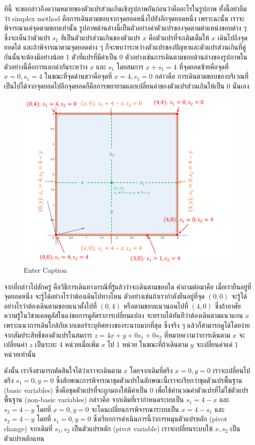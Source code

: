 ทีนี้ จะขอกล่าวถึงความหมายของตัวแปรส่วนเกินเชิงรูปภาพกันก่อนว่าคืออะไรในรูปภาพ ทั้งนี้อย่าลืมว่า simplex method คือการเดินตามขอบจากจุดยอดหนึ่งไปยังอีกจุดยอดหนึ่ง เพราะฉะนั้น เราจะพิจารณาแค่จุดตามขอบเท่านั้น รูปภาพด้านล่างนี้เป็นตัวอย่างค่าตัวแปรของจุดตามตำแหน่งขอบต่าง ๆ ซึ่งจะเห็นว่าตัวแปร $s_1$ ทีเป็นตัวแปรส่วนเกินของตัวแปร $x$ คือตัวแปรที่จะเติมเต็มให้ $x$ เดินไปถึงจุดยอดได้ และถ้าพิจารณาตามจุดยอดต่าง ๆ ก็จะพบว่าระหว่างตัวแปรของปัญหาและตัวแปรส่วนเกินที่คู่กันนั้นจะต้องมีอย่างน้อย 1 ตัวที่แปรที่มีค่าเป็น 0 ตัวอย่างเช่นการเดินตามขอบด้านล่างของรูปภาพในตัวอย่างนี้คือการแลกค่ากันระหว่าง $x$ และ $s_1$ โดยสมการ $x + s_1 = 4$ ที่จุดยอดซ้ายคือจุดที่ $x=0, s_1=4$ ในขณะที่จุดด้านขวาคือจุดที่ $x=4,s_1=0$ กล่าวคือ การเดินตามขอบของบริเวณที่เป็นไปได้จากจุดยอดไปอีกจุดยอดก็คือการพยายามแลกเปลี่ยนค่าของตัวแปรส่วนเกินให้เป็น 0 นั่นเอง

\begin{figure}[h!]
    \centering
    \includegraphics[width=0.7\linewidth]{basicSimplex2.png}
    \caption{Enter Caption}
    \label{fig:enter-label}
\end{figure}

จากที่กล่าวไปสักครู่ คือวิธีการเดินทางกรณีที่รู้แล้วว่าจะเดินตามขอบใด
คำถามต่อมาคือ เมื่อเรายืนอยู่ที่จุดยอดหนึ่ง จะรู้ได้อย่างไรว่าต้องเดินไปทางไหน ตัวอย่างเช่นถ้าเรากำลังยืนอยู่ที่จุด $(0,0)$ จะรู้ได้อย่างไรว่าต้องเดินตามขอบแนวตั้งไปที่ $(0,4)$ หรือตามขอบแนวนอนไปที่ $(4,0)$
ซึ่งถ้าอาศัยความรู้ในวิชาแคลคูลัสในแง่ขอการดูอัตราการเปลี่ยนแปลง จะทราบได้ทันทีว่าต้องเดินตามแนวแกน $x$ เพราะแนวการเดินใกล้กับเวกเตอร์ระบุทิศทางของระนาบมากที่สุด ซึ่งจริง ๆ แล้วก็สามารถดูได้โดยง่ายจากสัมประสิทธิ์ของตัวแปรในสมการ $z=4x+y+0s_1+0s_2$ ที่หมายความว่าการเดินตาม $x$ จะเปลี่ยนค่า $z$ เป็นระยะ 4 หน่วยเมื่อเพิ่ม $x$ ไป 1 หน่วย ในขณะที่ถ้าเดินตาม $y$ จะเปลี่ยนค่าแค่ 1 หน่วยเท่านั้น

ดังนั้น เราจึงสามารถตัดสินใจได้ว่าเราจะเดินตาม $x$ โดยจากเดิมที่ตรึง $x=0, y=0$ เราจะเปลี่ยนไปตรึง $s_1=0, y=0$ ซึ่งลักษณะการพิจารณาชุดตัวแปรในลักษณะนี้เราจะเรียกว่าชุดตัวแปรพื้นฐาน (basic variables) ซึ่งคือชุดตัวแปรที่จะถูกมองให้มีค่าเป็น 0 เพื่อใช้คำนวณค่าตัวแปรที่ไม่ใช่ตัวแปรพื้นฐาน (non-basic variables) กล่าวคือ จากเดิมที่เรากำหนดระบบเป็น $s_1 = 4 - x$ และ $s_2 = 4 - y$ โดยที่ $x=0, y=0$ จะโดนเปลี่ยนการพิจารณาระบบเป็น $x = 4 - s_1$ และ $s_2 = 4 - y$ โดยที่ $s_1=0, y=0$ ซึ่งเรียกการดำเนินการนี้ว่าการหมุนตัวแปรหลัก (pivot change) จากเดิมที่ $s_1, s_2$ เป็นตัวแปรหลัก (pivot variable) เราจะเปลี่ยนระบบให้ $x, s_2$ เป็นตัวแปรหลักแทน

